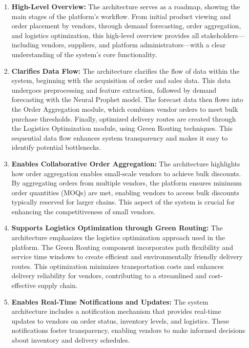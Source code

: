 \begin{enumerate}
    \item \textbf{High-Level Overview:} The architecture serves as a roadmap, showing the main stages of the platform’s workflow. From initial product viewing and order placement by vendors, through demand forecasting, order aggregation, and logistics optimization, this high-level overview provides all stakeholders—including vendors, suppliers, and platform administrators—with a clear understanding of the system’s core functionality.

    \item \textbf{Clarifies Data Flow:} The architecture clarifies the flow of data within the system, beginning with the acquisition of order and sales data. This data undergoes preprocessing and feature extraction, followed by demand forecasting with the Neural Prophet model. The forecast data then flows into the Order Aggregation module, which combines vendor orders to meet bulk purchase thresholds. Finally, optimized delivery routes are created through the Logistics Optimization module, using Green Routing techniques. This sequential data flow enhances system transparency and makes it easy to identify potential bottlenecks.

    \item \textbf{Enables Collaborative Order Aggregation:} The architecture highlights how order aggregation enables small-scale vendors to achieve bulk discounts. By aggregating orders from multiple vendors, the platform ensures minimum order quantities (MOQs) are met, enabling vendors to access bulk discounts typically reserved for larger chains. This aspect of the system is crucial for enhancing the competitiveness of small vendors.

    \item \textbf{Supports Logistics Optimization through Green Routing:} The architecture emphasizes the logistics optimization approach used in the platform. The Green Routing component incorporates path flexibility and service time windows to create efficient and environmentally friendly delivery routes. This optimization minimizes transportation costs and enhances delivery reliability for vendors, contributing to a streamlined and cost-effective supply chain.

    \item \textbf{Enables Real-Time Notifications and Updates:} The system architecture includes a notification mechanism that provides real-time updates to vendors on order status, inventory levels, and logistics. These notifications foster transparency, enabling vendors to make informed decisions about inventory and delivery schedules.


\end{enumerate}
